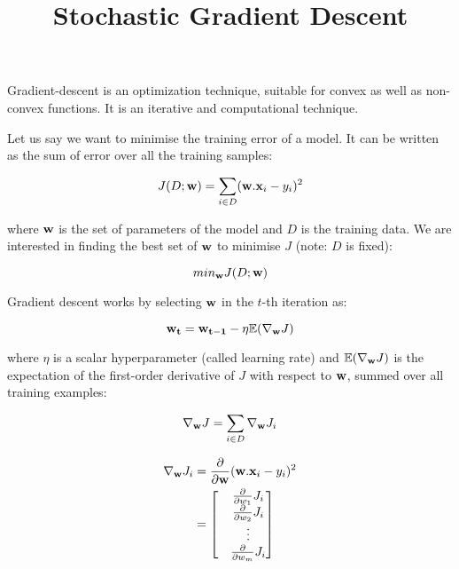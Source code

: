 \documentclass{article}
\title{Stochastic Gradient Descent}
\begin{document}
\maketitle

Gradient-descent is an optimization technique, suitable for convex as well as non-convex functions. It is an iterative and computational technique.

Let us say we want to minimise the training error of a model. It can be written as the sum of error over all the training samples:

\begin{equation}
J(D; {\bf w}) = \sum_{i \in D} ({\bf w}.{\bf x}_i - y_i)^2
\end{equation}

where ${\bf w}$ is the set of parameters of the model and $D$ is the training data. We are interested in finding the best set of $\bf w$ to minimise $J$ (note: $D$ is fixed):

\begin{equation}
min_{\bf w} J(D; {\bf w})
\end{equation}

Gradient descent works by selecting $\bf w$ in the $t$-th iteration as:

\begin{equation}
{\bf w_{t}} = {\bf w_{t - 1}} - \eta {\mathbb E} (\nabla_{\bf w} J)
\end{equation}

where $\eta$ is a scalar hyperparameter (called learning rate) and ${\mathbb E}(\nabla_{\bf w} J)$ is the expectation of the first-order derivative of $J$ with respect to $\bf w$, summed over all training examples:

\begin{equation}
\nabla_{\bf w} J = \sum_{i \in D} \nabla_{\bf w} J_i 
\end{equation}

\begin{align}
\nabla_{\bf w} J_i &= \frac{\partial}{\partial {\bf w}} ({\bf w}.{\bf x}_i - y_i)^2 \\
&= 
\begin{bmatrix}
&\frac{\partial}{\partial w_1} J_i \\
&\frac{\partial}{\partial w_2} J_i \\
&\vdots \\
&\frac{\partial}{\partial w_m} J_i \\
\end{bmatrix}
\end{align}
\end{document}
